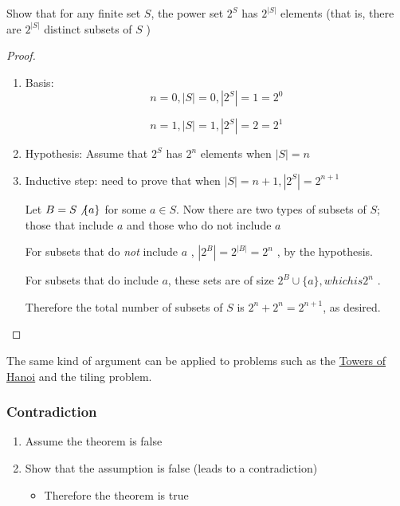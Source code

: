 \documentclass[10pt]{article}
\begin{document}
\begin{example}
	Show that for any finite set $ S $, the power set $ 2^S $ has $ 2^{|S|} $ elements (that is, there are $ 2^{|S|} $ distinct subsets of $ S $  )

	\begin{proof}

		\begin{enumerate}
			\item Basis: 
				\begin{equation}
				n = 0, |S| = 0, |2^S| = 1 = 2^0 
				\end{equation}

				\begin{equation}
					n = 1, |S| = 1, |2^S| = 2 = 2^1
				\end{equation}
			\item Hypothesis: Assume that $ 2^S $ has $ 2^n $ elements when $ |S| = n $ 
			\item Inductive step: need to prove that when $ |S| = n+1, |2^S| = 2^{n+1} $ 

				Let $ B = S  \not \{a\}  $ for some $ a \in S $. 
				Now there are two types of subsets of $ S $; those that include $ a $ and those who do not include $ a $ 

				For subsets that do \textit{not} include  $ a $ , $ |2^{B}| = 2^{|B|} = 2^n $ , by the hypothesis.

				For subsets that do include $ a $, these sets are of size $ 2^B \cup \{a\}, which is  2^n  $ .

				Therefore the total number of subsets of $ S $ is $ 2^n + 2^n = 2^{n+1} $, as desired.
		\end{enumerate}
	\end{proof}
	
\end{example}

The same kind of argument can be applied to problems such as the \href{https://en.wikipedia.org/wiki/Tower_of_Hanoi}{Towers of Hanoi} and the tiling problem.


\subsubsection{Contradiction}
\begin{enumerate}
	\item Assume the theorem is false
	\item Show that the assumption is false (leads to a contradiction)
		\begin{itemize}
	\item Therefore the theorem is true
		\end{itemize}
\end{enumerate}
\end{document}
